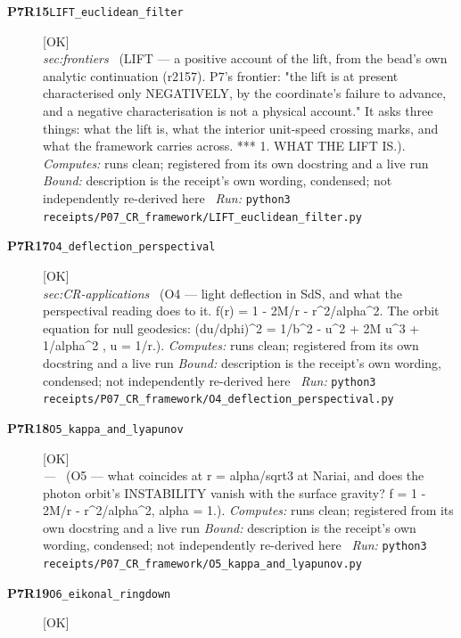 \begin{description}
\item[\textbf{P7R15}\quad\texttt{LIFT\_euclidean\_filter}]\hfill\textsf{[OK]}\\
\textit{sec:frontiers} \ (LIFT --- a positive account of the lift, from the bead's own analytic continuation (r2157). P7's frontier: "the lift is at present characterised only NEGATIVELY, by the coordinate's failure to advance, and a negative characterisation is not a physical account." It asks three things: what the lift is, what the interior unit-speed crossing marks, and what the framework carries across. *** 1. WHAT THE LIFT IS.). 
\emph{Computes:} runs clean; registered from its own docstring and a live run
 \emph{Bound:} description is the receipt's own wording, condensed; not independently re-derived here
\ \emph{Run:} \texttt{python3 receipts/P07\_CR\_framework/LIFT\_euclidean\_filter.py}
\item[\textbf{P7R17}\quad\texttt{O4\_deflection\_perspectival}]\hfill\textsf{[OK]}\\
\textit{sec:CR-applications} \ (O4 --- light deflection in SdS, and what the perspectival reading does to it. f(r) = 1 - 2M/r - r\textasciicircum{}2/alpha\textasciicircum{}2. The orbit equation for null geodesics: (du/dphi)\textasciicircum{}2 = 1/b\textasciicircum{}2 - u\textasciicircum{}2 + 2M u\textasciicircum{}3 + 1/alpha\textasciicircum{}2 , u = 1/r.). 
\emph{Computes:} runs clean; registered from its own docstring and a live run
 \emph{Bound:} description is the receipt's own wording, condensed; not independently re-derived here
\ \emph{Run:} \texttt{python3 receipts/P07\_CR\_framework/O4\_deflection\_perspectival.py}
\item[\textbf{P7R18}\quad\texttt{O5\_kappa\_and\_lyapunov}]\hfill\textsf{[OK]}\\
\textit{---} \ (O5 --- what coincides at r = alpha/sqrt3 at Nariai, and does the photon orbit's INSTABILITY vanish with the surface gravity? f = 1 - 2M/r - r\textasciicircum{}2/alpha\textasciicircum{}2, alpha = 1.). 
\emph{Computes:} runs clean; registered from its own docstring and a live run
 \emph{Bound:} description is the receipt's own wording, condensed; not independently re-derived here
\ \emph{Run:} \texttt{python3 receipts/P07\_CR\_framework/O5\_kappa\_and\_lyapunov.py}
\item[\textbf{P7R19}\quad\texttt{O6\_eikonal\_ringdown}]\hfill\textsf{[OK]}\\

\end{description}
